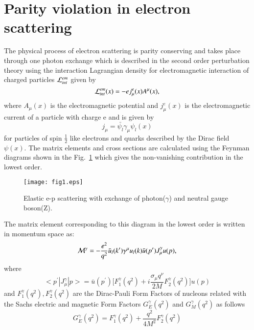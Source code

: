      \section{Parity violation in electron scattering}
     The physical process of electron scattering is parity conserving and takes place through one photon exchange which is described in the second order perturbation theory using the interaction Lagrangian density for electromagnetic interaction  of charged particles ${\cal L}_{int}^{em}$  given by 
     \begin{equation}
     {\cal L}_{int}^{em}(x) = -e j_{\mu}^{e}(x)A^{\mu}(x),
     \end{equation}
     where $A_\mu(x)$ is the electromagnetic potential and $j_\mu^e(x)$ is the electromagnetic current of a particle with charge e and is given by 
     \begin{equation}
     j_\mu =\bar{\psi_l}\gamma_\mu \psi_l(x)
     \end{equation}
     for particles of spin $\frac{1}{2}$ like electrons and quarks described by the Dirac field $\psi(x)$. The matrix elements and cross sections are calculated using the Feynman diagrams shown in the Fig.~\ref{Fig:1} which gives the non-vanishing contribution in the lowest order.
     \begin{figure}
      \begin{center}
      \texttt{[image: fig1.eps]}
      \caption{Elastic e-p scattering with exchange of photon($\gamma$) and neutral gauge boson(Z).}
      \label{Fig:1}
    \end{center}
    \end{figure}
     The matrix element corresponding to this diagram in the lowest order is written in momentum space as:
     \begin{equation}
     {\cal M}^{\gamma} = -\frac{e^2}{q^2}\bar{u}_l(k^\prime)\gamma^\mu u_l(k) \bar{u}(p^\prime)J_\mu^\gamma u(p),
    \end{equation}
  where 
  \begin{equation}
   <p^\prime|J_\mu^\gamma|p>= \bar{u}(p^\prime)\big[F_1^{\gamma}(q^2)+i\frac{\sigma_\mu q^\nu}{2M}F_2^{\gamma}(q^2)\big]u(p) 
   \end{equation}
  and $F_1^\gamma(q^2),F_2^\gamma(q^2) $ are the Dirac-Pauli Form Factors of nucleons related with the Sachs electric and magnetic Form Factors $G_E^\gamma(q^2)$ and $G_M^\gamma(q^2)$  as follows
  \begin{equation}
  G_E^\gamma(q^2) = F_1^\gamma(q^2)+\frac{q^2}{4M^2}F^\gamma_2(q^2)
  \end{equation}
  
